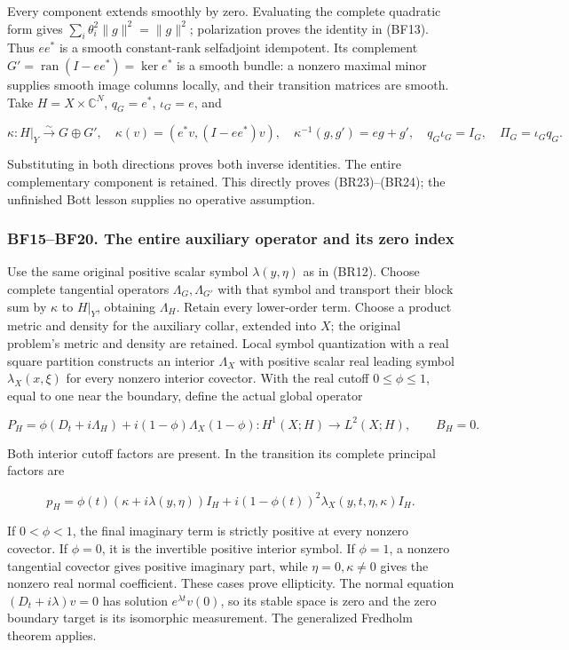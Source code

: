 \documentclass[
  11pt,
]{article}
\begin{document}
Every component extends smoothly by zero. Evaluating the complete
quadratic form gives \(\sum_i\theta_i^2\|g\|^2=\|g\|^2\); polarization
proves the identity in (BF13). Thus \(ee^*\) is a smooth constant-rank
selfadjoint idempotent. Its complement
\(G'=\operatorname{ran}(I-ee^*)=\ker e^*\) is a smooth bundle: a nonzero
maximal minor supplies smooth image columns locally, and their
transition matrices are smooth. Take \(H=X\times\mathbb C^N\),
\(q_G=e^*\), \(\iota_G=e\), and

\[
 \kappa:H|_Y\xrightarrow{\sim}G\oplus G',
 \quad \kappa(v)=(e^*v,(I-ee^*)v),
 \quad\kappa^{-1}(g,g')=eg+g',
 \quad q_G\iota_G=I_G,
 \quad \Pi_G=\iota_Gq_G.
 \tag{BF14}
\]

Substituting in both directions proves both inverse identities. The
entire complementary component is retained. This directly proves
(BR23)--(BR24); the unfinished Bott lesson supplies no operative
assumption.

\subsubsection{BF15--BF20. The entire auxiliary operator and its zero
index}\label{bf15bf20.-the-entire-auxiliary-operator-and-its-zero-index}

Use the same original positive scalar symbol \(\lambda(y,\eta)\) as in
(BR12). Choose complete tangential operators \(\Lambda_G,\Lambda_{G'}\)
with that symbol and transport their block sum by \(\kappa\) to
\(H|_Y\), obtaining \(\Lambda_H\). Retain every lower-order term. Choose
a product metric and density for the auxiliary collar, extended into
\(X\); the original problem's metric and density are retained. Local
symbol quantization with a real square partition constructs an interior
\(\Lambda_X\) with positive scalar real leading symbol
\(\lambda_X(x,\xi)\) for every nonzero interior covector. With the real
cutoff \(0\le\phi\le1\), equal to one near the boundary, define the
actual global operator

\[
 P_H=\phi(D_t+i\Lambda_H)
        +i(1-\phi)\Lambda_X(1-\phi):H^1(X;H)\to L^2(X;H),
 \qquad B_H=0.
 \tag{BF15}
\]

Both interior cutoff factors are present. In the transition its complete
principal factors are

\[
 p_H=\phi(t)(\kappa+i\lambda(y,\eta))I_H
              +i(1-\phi(t))^2\lambda_X(y,t,\eta,\kappa)I_H.
 \tag{BF16}
\]

If \(0<\phi<1\), the final imaginary term is strictly positive at every
nonzero covector. If \(\phi=0\), it is the invertible positive interior
symbol. If \(\phi=1\), a nonzero tangential covector gives positive
imaginary part, while \(\eta=0,\kappa\ne0\) gives the nonzero real
normal coefficient. These cases prove ellipticity. The normal equation
\((D_t+i\lambda)v=0\) has solution \(e^{\lambda t}v(0)\), so its stable
space is zero and the zero boundary target is its isomorphic
measurement. The generalized Fredholm theorem applies.
\end{document}
